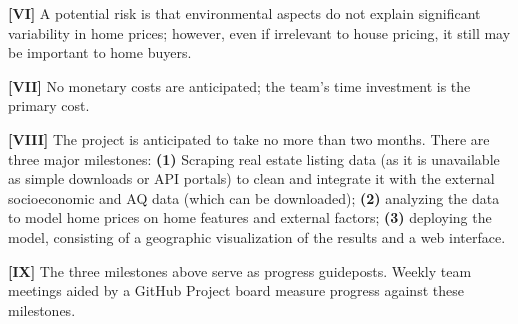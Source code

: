 \documentclass[sigconf,nonacm,11pt]{acmart}
\begin{document}

\textbf{[VI]}
A potential risk is that environmental aspects do not explain significant variability in home prices; however, even if irrelevant to house pricing, it still may be important to home buyers.

\textbf{[VII]}
No monetary costs are anticipated; the team's time investment is the primary cost.

\textbf{[VIII]}
The project is anticipated to take no more than two months. There are three major milestones: \textbf{(1)} Scraping real estate listing data (as it is unavailable as simple downloads or API portals) to clean and integrate it with the external socioeconomic and AQ data (which can be downloaded); \textbf{(2)} analyzing the data to model home prices on home features and external factors; \textbf{(3)} deploying the model, consisting of a geographic visualization of the results and a web interface.

\textbf{[IX]}
The three milestones above serve as progress guideposts. Weekly team meetings aided by a GitHub Project board measure progress against these milestones.
\end{document}
